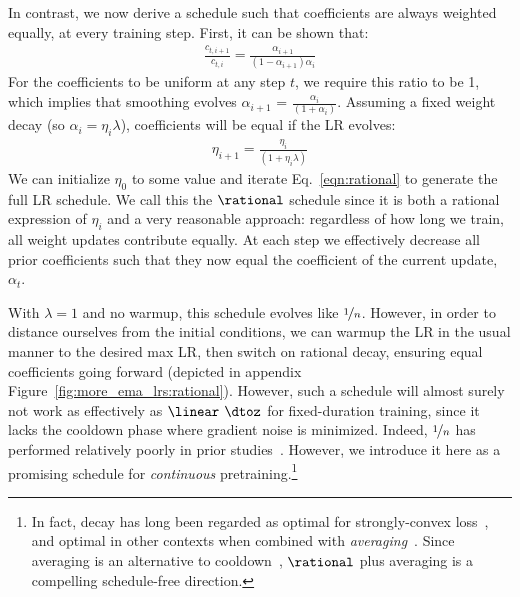 In contrast, we now derive a schedule such that coefficients are
always weighted equally, at every training step.  First, it can be
shown that:
\begin{eqnarray}
    \frac{c_{t,i+1}}{c_{t,i}} = \frac{\alpha_{i+1}}{(1-\alpha_{i+1})\alpha_i}
\end{eqnarray}
%
For the coefficients to be uniform at any step $t$, we require this
ratio to be 1, which implies that smoothing evolves $\alpha_{i+1}$ =
$\frac{\alpha_i}{(1+\alpha_i)}$.  Assuming a fixed weight decay (so
$\alpha_i = \eta_i\lambda$), coefficients will be equal if the LR
evolves:
\begin{eqnarray}\label{eqn:rational}
  \eta_{i+1} = \frac{\eta_i}{(1+\eta_i\lambda)}
\end{eqnarray}
We can initialize $\eta_0$ to some value and iterate
Eq.~\ref{eqn:rational} to generate the full LR schedule.  We call this
the $\rational$ schedule since it is both a rational expression of
$\eta_i$ and a very reasonable approach: regardless of how long we
train, all weight updates contribute equally.  At each step we
effectively decrease all prior coefficients such that they now equal
the coefficient of the current update, $\alpha_t$.
%

With $\lambda = 1$ and no warmup, this schedule evolves like
$\nicefrac{1}{n}$.  However, in order to distance ourselves from the
initial conditions, we can warmup the LR in the usual manner to the
desired max LR, then switch on rational decay, ensuring equal
coefficients going forward (depicted in appendix
Figure~\ref{fig:more_ema_lrs:rational}).
%
However, such a schedule will almost surely not work as effectively as
$\linear$ $\dtoz$ for fixed-duration training, since it lacks the
cooldown phase where gradient noise is minimized.  Indeed,
$\nicefrac{1}{n}$ has performed relatively poorly in prior
studies~\citep{ge2019step,defazio2023when}.
%
However, we introduce it here as a promising schedule for
\emph{continuous} pretraining.\footnote{In fact, 
decay has long been regarded as optimal for strongly-convex
loss~\citep{robbins1951stochastic}, and optimal in other contexts when
combined with \emph{averaging}~\citep{defazio2023when}.  Since
averaging is an alternative to cooldown~\citep{hagele2024scaling},
$\rational$ plus averaging is a compelling schedule-free direction.}
%

